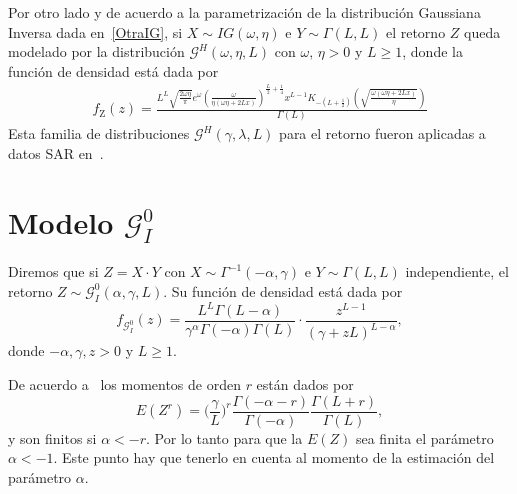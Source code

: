 Por otro lado y de acuerdo a la parametrización de la distribución Gaussiana Inversa dada en~\eqref{OtraIG}, si $X\sim IG(\omega,\eta)$ e $Y \sim \Gamma(L,L)$ el retorno $Z$ queda modelado por la distribución $ \mathcal{G}^H(\omega,\eta,L)$ con $\omega, \, \eta >0$ y $L \geq 1$, donde la función de densidad está dada por 
\begin{align}
\label{ModeloGI}
f_{\text{Z}}( z) =\frac{L^L \sqrt{\frac{2 \omega  \eta }{\pi }} e^{\omega } \left(\frac{\omega }{\eta  (\omega  \eta +2 L
		x)}\right)^{\frac{L}{2}+\frac{1}{4}} x^{L-1} K_{-\left(L+\frac{1}{2}\right)}\left(\sqrt{\frac{\omega 
			(\omega  \eta +2 L x)}{\eta }}\right)}{\Gamma (L)}
\end{align}
Esta familia de distribuciones $\mathcal{G}^H(\gamma,\lambda,L)$ para el retorno fueron aplicadas a datos SAR en~\cite{Buemi2009,Jacobo2005}.


\section{Modelo $\mathcal{G}_I^0$}
\label{ModeloGI0}

Diremos que si $Z=X \cdot Y$ con $X \sim \Gamma^{-1}(-\alpha,\gamma)$ e $Y \sim \Gamma(L,L)$ independiente, el retorno $Z \sim \mathcal{G}_I^0(\alpha,\gamma,L)$. Su función de densidad está dada por 
\begin{equation}
f_{\mathcal{G}_I^{0}}( z) =\frac{L^{L}\Gamma ( L-\alpha
	) }{\gamma ^{\alpha }\Gamma ( -\alpha ) \Gamma (
	L) }\cdot  
\frac{z^{L-1}}{( \gamma +zL) ^{L-\alpha }},%
\label{ec_dens_gI0}
\end{equation}
donde $-\alpha,\gamma ,z>0$ y $L\geq 1$.

De acuerdo a~\cite{gambini2015} los momentos de orden $r$ están dados por
\begin{equation}
E(Z^r) =\Big(\frac{\gamma}{L}\Big)^r\frac{\Gamma ( -\alpha-r )}{ \Gamma (-\alpha) }
\frac{\Gamma (L+r )}{\Gamma (L)},
\label{moments_gI0}
\end{equation}
y son finitos si $\alpha<-r$. Por lo tanto para que la $E(Z)$ sea finita el parámetro $\alpha<-1$. Este punto hay que tenerlo en cuenta al momento de la estimación del parámetro $\alpha$.

